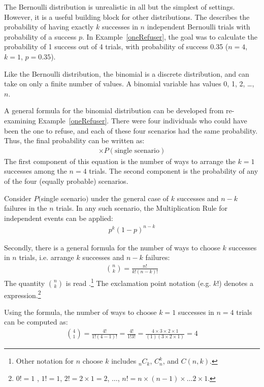 The Bernoulli distribution is unrealistic in all but the simplest of settings. However, it is a useful building block for other distributions. The  describes the probability of having exactly $k$ successes in $n$ independent Bernoulli trials with probability of a success $p$. In Example~\ref{oneRefuser}, the goal was to calculate the probability of 1 success out of 4 trials, with probability of success 0.35 ($n=4$, $k=1$, $p=0.35$). 

Like the Bernoulli distribution, the binomial is a discrete distribution, and can take on only a finite number of values. A binomial variable has values 0, 1, 2, \dots, $n$.

A general formula for the binomial distribution can be developed from re-examining Example~\ref{oneRefuser}. There were four individuals who could have been the one to refuse, and each of these four scenarios had the same probability. Thus, the final probability can be written as:
\begin{eqnarray}
[\text{\# of scenarios}] \times P(\text{single scenario})
\label{genBinomialFormula}
\end{eqnarray}
The first component of this equation is the number of ways to arrange the $k=1$ successes among the $n=4$ trials. The second component is the probability of any of the four (equally probable) scenarios.

Consider $P($single scenario$)$ under the general case of $k$ successes and $n-k$ failures in the $n$ trials. In any such scenario, the Multiplication Rule for independent events can be applied:
\begin{eqnarray*}
	p^k(1-p)^{n-k}
\end{eqnarray*}

Secondly, there is a general formula for the number of ways to choose $k$ successes in $n$ trials, i.e. arrange $k$ successes and $n-k$ failures:
\begin{eqnarray*}
	{n\choose k} = \frac{n!}{k!(n-k)!}
\end{eqnarray*}
The quantity ${n\choose k}$ is read .\footnote{Other notation for $n$ choose $k$ includes $_nC_k$, $C_n^k$, and $C(n,k)$.} The exclamation point notation (e.g. $k!$) denotes a \label{factorialDefinitionInTheBinomialSection} expression.\footnote{$0! = 1$ \label{zeroFactorial}, $1! = 1$, $2! = 2 \times 1 = 2$, $\dots$, $n! = n\times (n-1) \times \dots 2 \times 1$.}

Using the formula, the number of ways to choose $k=1$ successes in $n=4$ trials can be computed as:
\begin{eqnarray*}
	{4 \choose 1} = \frac{4!}{1!(4-1)!} =  \frac{4!}{1!3!} 
	= \frac{4\times3\times2\times1}{(1)(3\times2\times1)} = 4
\end{eqnarray*}

